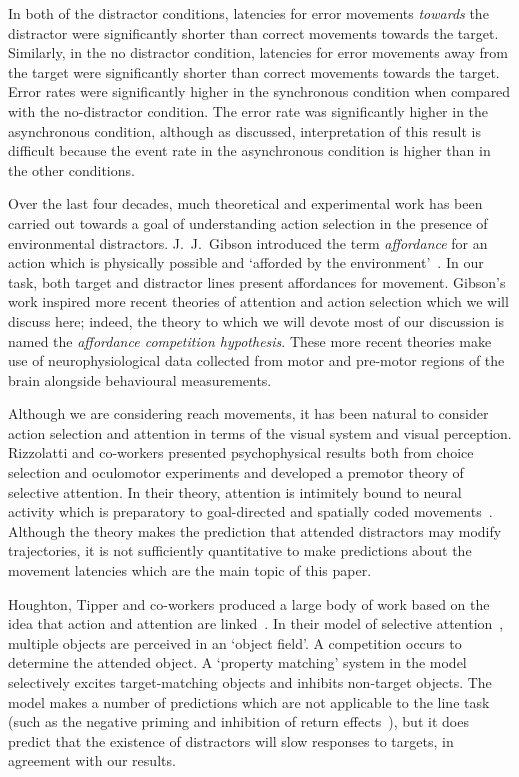 \documentclass[10pt,letterpaper]{article}
\begin{document}
In both of the distractor conditions, latencies for error movements
\emph{towards} the distractor were significantly shorter than correct
movements towards the target. Similarly, in the no distractor
condition, latencies for error movements away from the target were
significantly shorter than correct movements towards the target. Error
rates were significantly higher in the synchronous condition when
compared with the no-distractor condition. The error rate was
significantly higher in the asynchronous condition, although as
discussed, interpretation of this result is difficult because the
event rate in the asynchronous condition is higher than in the other
conditions.

Over the last four decades, much theoretical and experimental work has
been carried out towards a goal of understanding action selection in
the presence of environmental distractors. J.~J.~Gibson introduced the
term \emph{affordance} for an action which is physically possible and
`afforded by the environment'~\cite{gibson_ecological_1979}. In our
task, both target and distractor lines present affordances for
movement. Gibson's work inspired more recent theories of attention and
action selection which we will discuss here; indeed, the theory to
which we will devote most of our discussion is named the
\emph{affordance competition hypothesis}. These more recent theories
make use of neurophysiological data collected from motor and pre-motor
regions of the brain alongside behavioural measurements.

Although we are considering reach movements, it has been natural to
consider action selection and attention in terms of the visual system
and visual perception. Rizzolatti and co-workers presented
psychophysical results both from choice selection and oculomotor
experiments and developed a premotor theory of selective attention. In
their theory, attention is intimitely bound to neural activity which
is preparatory to goal-directed and spatially coded
movements~\cite{rizzolatti_space_1994}. Although the theory makes the
prediction that attended distractors may modify trajectories, it is
not sufficiently quantitative to make predictions about the movement
latencies which are the main topic of this paper.

Houghton, Tipper and co-workers produced a large body of work based on
the idea that action and attention are
linked~\cite{tipper_selective_1992,
  houghton_model_1994,houghton_inhibition_1996,tipper_selective_1997,
  tipper_actionbased_1998,tipper_reaching_2001}. In their model of
selective
attention~\cite{houghton_model_1994,houghton_inhibition_1996},
multiple objects are perceived in an `object field'. A competition
occurs to determine the attended object. A `property matching' system
in the model selectively excites target-matching objects and inhibits
non-target objects. The model makes a number of predictions which are
not applicable to the line task (such as the negative priming and
inhibition of return effects~\cite{houghton_model_1994}), but it does
predict that the existence of distractors will slow responses to
targets, in agreement with our results.
\end{document}
